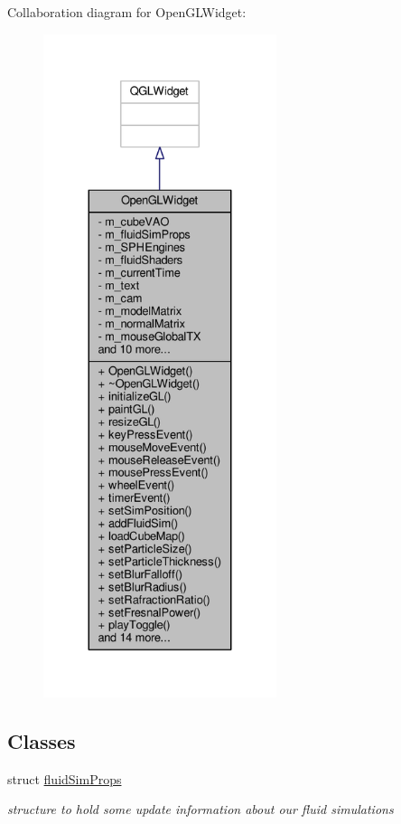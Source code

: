 Collaboration diagram for Open\-G\-L\-Widget\-:\nopagebreak
\begin{figure}[H]
\begin{center}
\leavevmode
\includegraphics[height=550pt]{class_open_g_l_widget__coll__graph}
\end{center}
\end{figure}
\subsection*{Classes}
\begin{DoxyCompactItemize}
\item 
struct \hyperlink{struct_open_g_l_widget_1_1fluid_sim_props}{fluid\-Sim\-Props}
\begin{DoxyCompactList}\small\item\em structure to hold some update information about our fluid simulations \end{DoxyCompactList}\end{DoxyCompactItemize}
